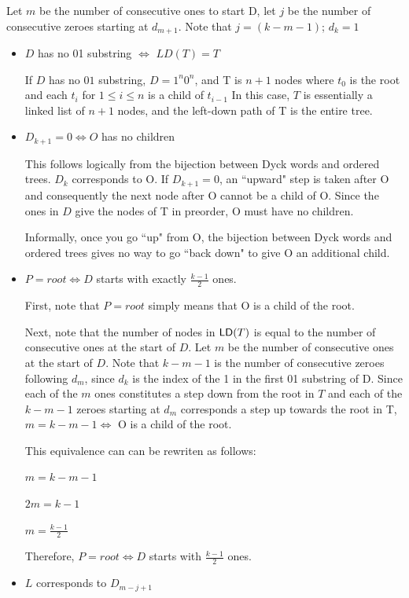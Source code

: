 Let $m$ be the number of consecutive ones to start D, let $j$ be the number of consecutive zeroes starting at $d_{m+1}$.  Note that $j=(k-m-1)$; $d_{k}=1$
\begin{itemize}
    \item $D$ has no 01 substring $\iff$ $LD(T)=T$


	If $D$ has no $01$ substring, $D=1^n0^n$, and T is $n+1$ nodes where $t_0$ is the root and each $t_i$ for $1\le i \le n$ is a child of $t_{i-1}$  In this case, $T$ is essentially a linked list of $n+1$ nodes, and the left-down path of T is the entire tree.
    \item $D_{k+1} = 0 \iff O$ has no children

	This follows logically from the bijection between Dyck words and ordered trees.  $D_k$ corresponds to O.  If $D_{k+1}=0$, an ``upward" step is taken after O and consequently the next node after O cannot be a child of O.  Since the ones in $D$ give the nodes of T in preorder, O must have no children.

	Informally, once you go ``up" from O, the bijection between Dyck words and ordered trees gives no way to go ``back down" to give O an additional child.
    \item $P=root \iff D$ starts with exactly $\frac{k-1}{2}$ ones.

	First, note that $P=root$ simply means that O is a child of the root.

	Next, note that the number of nodes in $\mathsf{LD}{(T)}$ is equal to the number of consecutive ones at the start of $D$.  Let $m$ be the number of consecutive ones at the start of $D$.  Note that $k-m-1$ is the number of consecutive zeroes following $d_m$, since $d_k$ is the index of the 1 in the first 01 substring of D. Since each of the $m$ ones constitutes a step down from the root in $T$ and each of the $k-m-1$ zeroes starting at $d_m$ corresponds a step up towards the root in T, $m=k-m-1 \iff $ O is a child of the root. 

	This equivalence can can be rewriten as follows: 

	$m=k-m-1$

	$2m=k-1$

	$m=\frac{k-1}{2}$


	Therefore, $P=root \iff D$  starts with $\frac{k-1}{2}$ ones.

    \item $L$ corresponds to $D_{m-j+1}$

	
\end{itemize}
